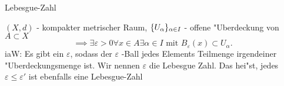 \documentclass[class=article, crop=false]{standalone}
\begin{document}
\begin{zettel}{Lebesgue-Zahl}
\begin{flashcard}
\begin{definition}
$(X,d)$ - kompakter metrischer Raum,
$\set{ U_{\alpha}  }_{\alpha \in  I}$ - offene "Uberdeckung von $A \subset X$ 
\[
    \implies \exists \varepsilon > 0 \forall x \in  A \exists \alpha \in  I \text{ mit } B_{\varepsilon }(x) \subset U_{\alpha }
.\]
iaW: Es gibt ein $\varepsilon$, sodass der $\varepsilon$ -Ball  jedes Elements Teilmenge irgendeiner "Uberdeckungsmenge ist. Wir nennen $\varepsilon $ die Lebesgue Zahl. Das hei"st, jedes $\varepsilon \leq \varepsilon'$ ist ebenfalls eine Lebesgue-Zahl
\end{definition}
\end{flashcard}
\end{zettel}
\end{document}
